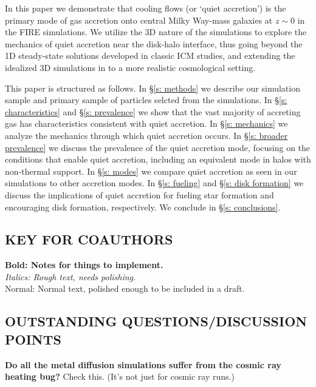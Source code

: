 \documentclass[fleqn,usenatbib]{mnras}
\begin{document}
In this paper we demonstrate that cooling flows (or `quiet accretion') is the primary mode of gas accretion onto central Milky Way-mass galaxies at $z \sim 0$ in the FIRE simulations. 
We utilize the 3D nature of the simulations to explore the mechanics of quiet accretion near the disk-halo interface, thus going beyond the 1D steady-state solutions developed in classic ICM studies, and extending the idealized 3D simulations in \cite{Stern2020} to a more realistic cosmological setting. 

This paper is structured as follows. 
In \S\ref{s: methods} we describe our simulation sample and primary sample of particles selcted from the simulations.
In \S\ref{s: characteristics} and \S\ref{s: prevalence} we show that the vast majority of accreting gas has characteristics consistent with quiet accretion.
In \S\ref{s: mechanics} we analyze the mechanics through which quiet accretion occurs.
In \S\ref{s: broader prevalence} we discuss the prevalence of the quiet accretion mode, focusing on the conditions that enable quiet accretion, including an equivalent mode in halos with non-thermal support.
In \S\ref{s: modes} we compare quiet accretion as seen in our simulations to other accretion modes.
In \S\ref{s: fueling} and \S\ref{s: disk formation} we discuss the implications of quiet accretion for fueling star formation and encouraging disk formation, respectively.
We conclude in \S\ref{s: conclusions}.


\subsection{KEY FOR COAUTHORS}
\textbf{Bold: Notes for things to implement.} \\
\textit{Italics: Rough text, needs polishing.} \\
Normal: Normal text, polished enough to be included in a draft.

\subsection{OUTSTANDING QUESTIONS/DISCUSSION POINTS}

\textbf{Do all the metal diffusion simulations suffer from the cosmic ray heating bug?}
Check this. (It's not just for cosmic ray runs.)
\end{document}
